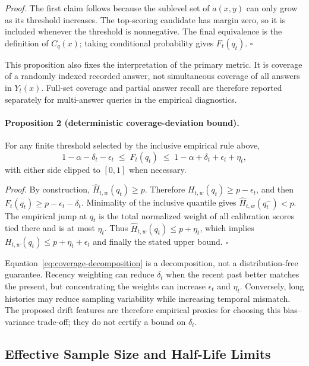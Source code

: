 \emph{Proof.}
The first claim follows because the sublevel set of \(a(x,y)\) can only grow as
its threshold increases.  The top-scoring candidate has margin zero, so it is
included whenever the threshold is nonnegative.  The final equivalence is the
definition of \(C_q(x)\); taking conditional probability gives \(F_t(q_t)\).
\hfill\(\square\)

This proposition also fixes the interpretation of the primary metric.  It is
coverage of a randomly indexed recorded answer, not simultaneous coverage of
all answers in \(Y_t(x)\).  Full-set coverage and partial answer recall are
therefore reported separately for multi-answer queries in the empirical
diagnostics.

\paragraph{Proposition 2 (deterministic coverage-deviation bound).}
For any finite threshold selected by the inclusive empirical rule above,
\[
  1-\alpha-\delta_t-\epsilon_t
  \;\leq\;F_t(q_t)\;\leq\;
  1-\alpha+\delta_t+\epsilon_t+\eta_t,
  \tag{1}\label{eq:coverage-decomposition}
\]
with either side clipped to \([0,1]\) when necessary.

\emph{Proof.}
By construction, \(\widehat H_{t,w}(q_t)\geq p\).  Therefore
\(H_{t,w}(q_t)\geq p-\epsilon_t\), and then
\(F_t(q_t)\geq p-\epsilon_t-\delta_t\).  Minimality of the inclusive quantile
gives \(\widehat H_{t,w}(q_t^-)<p\).  The empirical jump at \(q_t\) is the
total normalized weight of all calibration scores tied there and is at most
\(\eta_t\).  Thus
\(\widehat H_{t,w}(q_t)\leq p+\eta_t\), which implies
\(H_{t,w}(q_t)\leq p+\eta_t+\epsilon_t\) and finally the stated upper bound.
\hfill\(\square\)

Equation~\eqref{eq:coverage-decomposition} is a decomposition, not a
distribution-free guarantee.  Recency weighting can reduce \(\delta_t\) when
the recent past better matches the present, but concentrating the weights can
increase \(\epsilon_t\) and \(\eta_t\).  Conversely, long histories may reduce
sampling variability while increasing temporal mismatch.  The proposed drift
features are therefore empirical proxies for choosing this bias--variance
trade-off; they do not certify a bound on \(\delta_t\).

\subsection{Effective Sample Size and Half-Life Limits}

